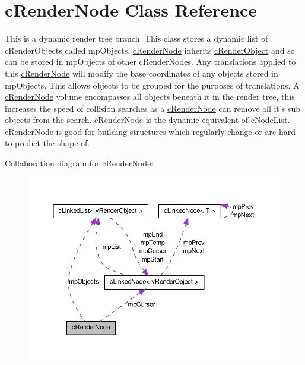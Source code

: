 \hypertarget{classc_render_node}{
\section{cRenderNode Class Reference}
\label{classc_render_node}
}


This is a dynamic render tree branch. This class stores a dynamic list of cRenderObjects called mpObjects. \hyperlink{classc_render_node}{cRenderNode} inherits \hyperlink{classc_render_object}{cRenderObject} and so can be stored in mpObjects of other cRenderNodes. Any translations applied to this \hyperlink{classc_render_node}{cRenderNode} will modify the base coordinates of any objects stored in mpObjects. This allows objects to be grouped for the purposes of translations. A \hyperlink{classc_render_node}{cRenderNode} volume encompasses all objects beneath it in the render tree, this increases the speed of collision searches as a \hyperlink{classc_render_node}{cRenderNode} can remove all it's sub objects from the search. \hyperlink{classc_render_node}{cRenderNode} is the dynamic equivalent of cNodeList. \hyperlink{classc_render_node}{cRenderNode} is good for building structures which regularly change or are hard to predict the shape of.  




Collaboration diagram for cRenderNode:\nopagebreak
\begin{figure}[H]
\begin{center}
\leavevmode
\includegraphics[width=397pt]{classc_render_node__coll__graph}
\end{center}
\end{figure}
